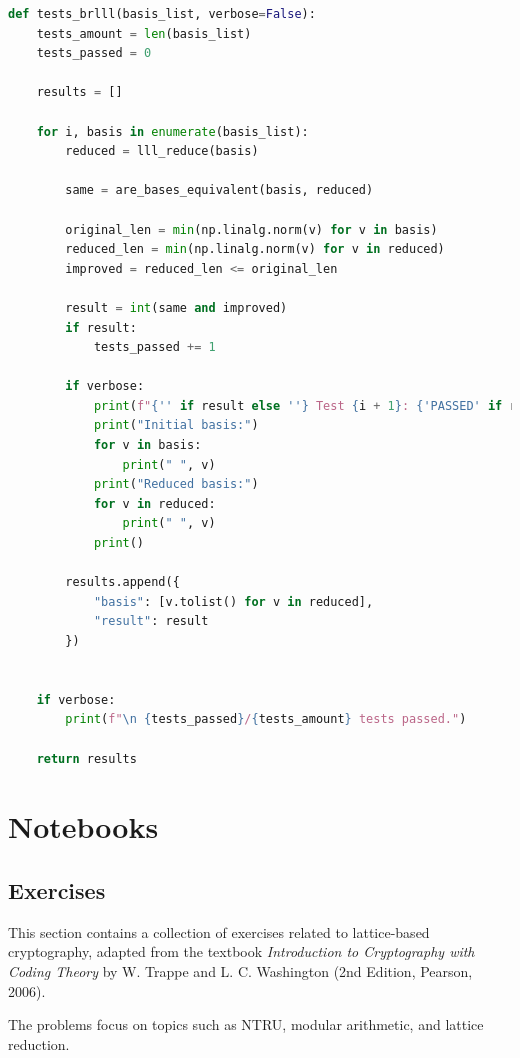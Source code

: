 \documentclass[a4paper,12pt]{article}
\begin{document}
\begin{lstlisting}[language=Python]
def tests_brlll(basis_list, verbose=False):
    tests_amount = len(basis_list)
    tests_passed = 0

    results = []

    for i, basis in enumerate(basis_list):
        reduced = lll_reduce(basis)

        same = are_bases_equivalent(basis, reduced)

        original_len = min(np.linalg.norm(v) for v in basis)
        reduced_len = min(np.linalg.norm(v) for v in reduced)
        improved = reduced_len <= original_len

        result = int(same and improved)
        if result:
            tests_passed += 1

        if verbose:
            print(f"{'' if result else ''} Test {i + 1}: {'PASSED' if result else 'FAILED'}")
            print("Initial basis:")
            for v in basis:
                print(" ", v)
            print("Reduced basis:")
            for v in reduced:
                print(" ", v)
            print()

        results.append({
            "basis": [v.tolist() for v in reduced],
            "result": result
        })


    if verbose:
        print(f"\n {tests_passed}/{tests_amount} tests passed.")

    return results
\end{lstlisting}










\section{Notebooks}
\subsection{Exercises}
This section contains a collection of exercises related to lattice-based cryptography,  
adapted from the textbook \textit{Introduction to Cryptography with Coding Theory}  
by W. Trappe and L. C. Washington (2nd Edition, Pearson, 2006).  

The problems focus on topics such as NTRU, modular arithmetic, and lattice reduction.
\end{document}
